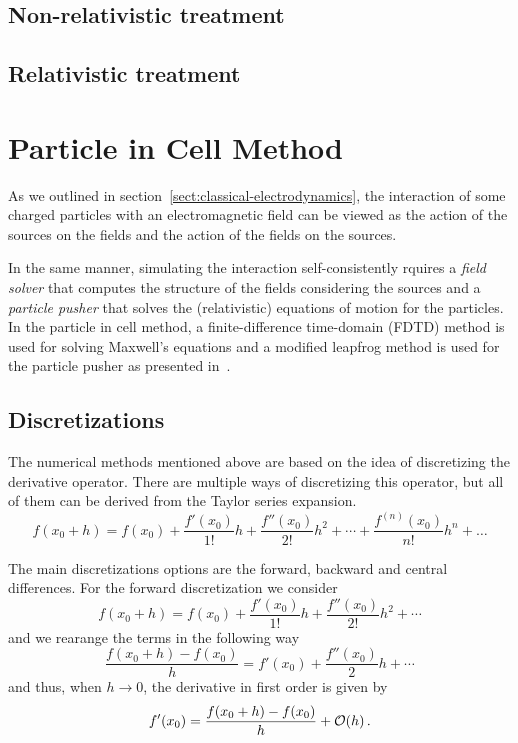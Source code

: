 \documentclass[class=report, crop=false]{standalone}
\begin{document}
\subsection{Non-relativistic treatment}

\subsection{Relativistic treatment}

\section{Particle in Cell Method}

As we outlined in section~\ref{sect:classical-electrodynamics}, the interaction
of some charged particles with an electromagnetic field can be viewed as the
action of the sources on the fields and the action of the fields on the sources.

In the same manner, simulating the interaction self-consistently rquires a
\emph{field solver} that computes the structure of the fields considering
the sources and a \emph{particle pusher} that solves the (relativistic)
equations of motion for the particles.
In the particle in cell method, a finite-difference time-domain (FDTD) method
is used for solving Maxwell's equations and a modified leapfrog method is used
for the particle pusher as presented in~\cite{arber_contemporaryparticleincell_2015}.

\subsection{Discretizations}

The numerical methods mentioned above are based on the idea of discretizing the
derivative operator. There are multiple ways of discretizing this operator,
but all of them can be derived from the Taylor series expansion.
\[
  f(x_0+h) = f(x_0) + \frac{f'(x_0)}{1!}h + \frac{f''(x_0)}{2!}h^2 + \dotsb + \frac{f^{(n)}(x_0)}{n!}h^n + \dots
\]

The main discretizations options are the forward, backward and central differences.
For the forward discretization we consider
\[
  f(x_0+h) = f(x_0) + \frac{f'(x_0)}{1!}h + \frac{f''(x_0)}{2!}h^2 + \dotsb
\]
and we rearange the terms in the following way
\[
  \frac{f(x_0+h) - f(x_0)}{h} = f'(x_0) + \frac{f''(x_0)}{2}h + \dotsb
\]
and thus, when \(h \to 0\), the derivative in first order is given by
\[
  f'(x_0) = \frac{f(x_0+h) - f(x_0)}{h} + \order{h}\,.
\]
\end{document}
